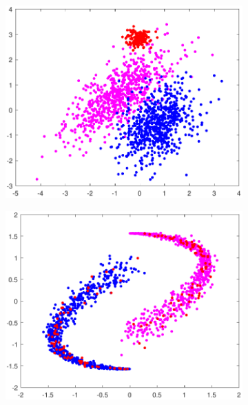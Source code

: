 \documentclass[preprint,12pt]{elsarticle}
\begin{document}
	
	\begin{figure}[!htb]
		\centering
		\begin{subfigure}[b]{0.40\linewidth}
			\centering\includegraphics[width=1\linewidth]{figures/kcstep/nddatamodel.pdf}
			\caption{\label{fig:dmodel1}} 
		\end{subfigure}
		\begin{subfigure}[b]{0.40\linewidth}
			\centering\includegraphics[width=1\linewidth]{figures/kcstep/yydatamodel.pdf}
			\caption{\label{fig:dmodel2}} 
		\end{subfigure} \\
		

\end{figure}
\end{document}
